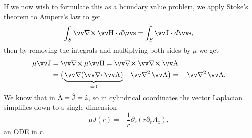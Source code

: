 \documentclass[margin=small]{tex/hsrzf}
\theoremstyle{elmagzf}
\begin{document}
If we now wish to formulate this as a boundary value problem, we apply Stoke's
theorem to Ampere's law to get
\[
  \int_S \curl \vec{H} \dotp d\vec{s} = \int_S \vec{J} \dotp d\vec{s},
\]
then by removing the integrals and multiplying both sides by \(\mu\) we get
\begin{align*}
  \mu \vec{J} &= \curl \mu \vec{H} = \curl \curl \vec{A} \\
    &= \big(
        \underbrace{\grad ( \div \vec{A} )}_{= 0}
        - \vlaplacian \vec{A}
      \big) = -\vlaplacian \vec{A}. \\
\end{align*}
We know that in \(\hat{\mathrm{A}} = \hat{\mathrm{J}} = \hat{\mathrm{z}}\), so in cylindrical
coordinates the vector Laplacian simplifies down to a single dimension
\begin{equation} \label{eqn:classic-az-ode}
  \mu J(r) = - \frac{1}{r} \partial_r ( r \partial_r A_z ),
\end{equation}
an ODE in \(r\).
\end{document}
